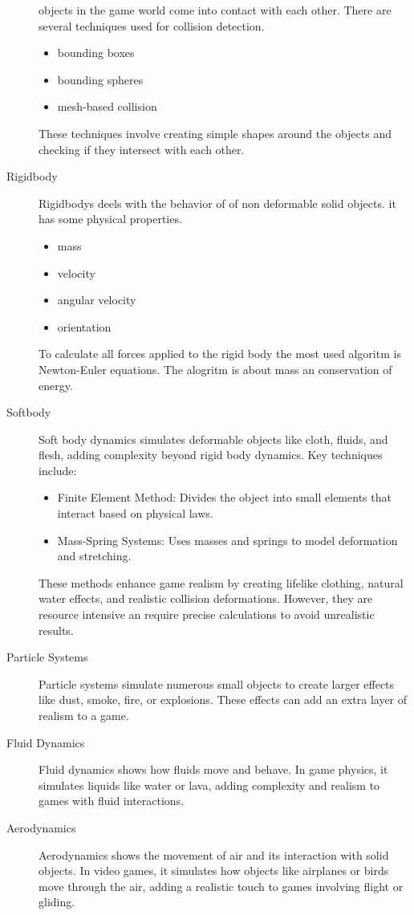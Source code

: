 \documentclass{projdoc}
\begin{document}
\begin{description}
		objects in the game world come into contact with each other. There are several
		techniques used for collision detection.
		\begin{itemize}
			\item bounding boxes
			\item bounding spheres
			\item mesh-based collision
		\end{itemize}
		These techniques involve creating simple shapes around the objects and checking
		if they intersect with each other.
	\item[Rigidbody] Rigidbodys deels with the behavior of of non deformable solid
		objects. it has some physical properties.
		\begin{itemize}
			\item mass
			\item velocity
			\item angular velocity
			\item orientation
		\end{itemize}
		To calculate all forces applied to the rigid body the most used algoritm is
		Newton-Euler equations. The alogritm is about mass an conservation of energy.
	\item[Softbody] Soft body dynamics simulates deformable objects like cloth, fluids,
		and flesh, adding complexity beyond rigid body dynamics. Key techniques
		include:\noparbreak
		\begin{itemize}
			\item Finite Element Method: Divides the object into small elements that
				interact based on physical laws.
			\item Mass-Spring Systems: Uses masses and springs to model deformation and
				stretching.
		\end{itemize}
		These methods enhance game realism by creating lifelike clothing, natural water
		effects, and realistic collision deformations. However, they are resource
		intensive an require precise calculations to avoid unrealistic results.
		\item[Particle Systems] Particle systems simulate numerous small objects to
			create larger effects like dust, smoke, fire, or explosions. These effects can
			add an extra layer of realism to a game.
		\item[Fluid Dynamics] Fluid dynamics shows how fluids move and behave. In game
			physics, it simulates liquids like water or lava, adding complexity and realism
			to games with fluid interactions.
		\item[Aerodynamics] Aerodynamics shows the movement of air and its interaction
			with solid objects. In video games, it simulates how objects like airplanes or
			birds move through the air, adding a realistic touch to games involving flight
			or gliding.
\end{description}
\end{document}
